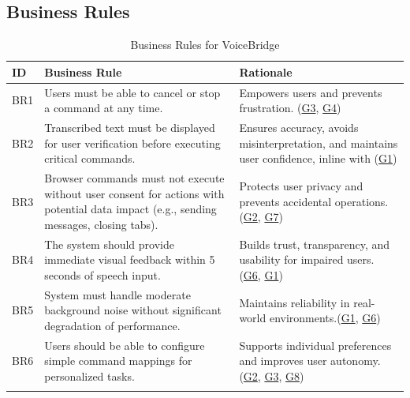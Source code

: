 \documentclass[11pt]{article}
\begin{document}
\subsection{Business Rules}

\begin{table}[H]
\centering
\begin{tabularx}{\textwidth}{p{1cm} X X}
\toprule
\textbf{ID} & \textbf{Business Rule} & \textbf{Rationale} \\
\midrule
BR1 & Users must be able to cancel or stop a command at any time. & Empowers users and prevents frustration. (\hyperref[tab:project-goals]{G3}, \hyperref[tab:project-goals]{G4}) \\
BR2 & Transcribed text must be displayed for user verification before executing critical commands. & Ensures accuracy, avoids misinterpretation, and maintains user confidence, inline with (\hyperref[tab:project-goals]{G1}) \\
BR3 & Browser commands must not execute without user consent for actions with potential data impact (e.g., sending messages, closing tabs). & Protects user privacy and prevents accidental operations. (\hyperref[tab:project-goals]{G2}, \hyperref[tab:project-goals]{G7}) \\
BR4 & The system should provide immediate visual feedback within 5 seconds of speech input. & Builds trust, transparency, and usability for impaired users. (\hyperref[tab:project-goals]{G6}, \hyperref[tab:project-goals]{G1}) \\
BR5 & System must handle moderate background noise without significant degradation of performance. & Maintains reliability in real-world environments.(\hyperref[tab:project-goals]{G1}, \hyperref[tab:project-goals]{G6}) \\
BR6 & Users should be able to configure simple command mappings for personalized tasks. & Supports individual preferences and improves user autonomy. (\hyperref[tab:project-goals]{G2}, \hyperref[tab:project-goals]{G3}, \hyperref[tab:project-goals]{G8}) \\
\bottomrule
\caption{Business Rules for VoiceBridge}
\end{tabularx}
\end{table}
\end{document}
